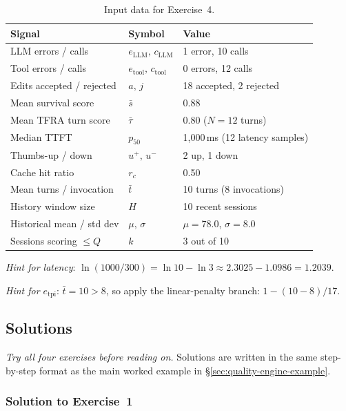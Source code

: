 \documentclass[11pt,a4paper]{article}
\begin{document}
\begin{table}[h!]
\centering
\caption{Input data for Exercise~4.}
\label{tab:ex4-input}
\begin{tabular}{@{}lll@{}}
\toprule
Signal & Symbol & Value \\
\midrule
LLM errors / calls & $e_{\text{LLM}},\,c_{\text{LLM}}$ & 1 error, 10 calls \\
Tool errors / calls & $e_{\text{tool}},\,c_{\text{tool}}$ & 0 errors, 12 calls \\
Edits accepted / rejected & $a,\,j$ & 18 accepted, 2 rejected \\
Mean survival score & $\bar{s}$ & 0.88 \\
Mean TFRA turn score & $\bar{\tau}$ & 0.80 \hfill($N=12$ turns) \\
Median TTFT & $p_{50}$ & 1{,}000\,ms \hfill(12 latency samples) \\
Thumbs-up / down & $u^+,\,u^-$ & 2 up, 1 down \\
Cache hit ratio & $r_c$ & 0.50 \\
Mean turns / invocation & $\bar{t}$ & 10 turns \hfill(8 invocations) \\
\midrule
History window size & $H$ & 10 recent sessions \\
Historical mean / std dev & $\mu,\,\sigma$ & $\mu=78.0$, $\sigma=8.0$ \\
Sessions scoring $\leq Q$ & $k$ & 3 out of 10 \\
\bottomrule
\end{tabular}
\end{table}

\noindent\emph{Hint for latency}:
$\ln(1000/300)=\ln10-\ln3\approx2.3025-1.0986=1.2039$.

\noindent\emph{Hint for $e_{\mathrm{tpi}}$}: $\bar{t}=10>8$, so apply
the linear-penalty branch: $1-(10-8)/17$.

\subsection{Solutions}
\label{app:solutions}

\textit{Try all four exercises before reading on.}
Solutions are written in the same step-by-step format as the main worked
example in \S\ref{sec:quality-engine-example}.

\subsubsection*{Solution to Exercise~1}
\end{document}
